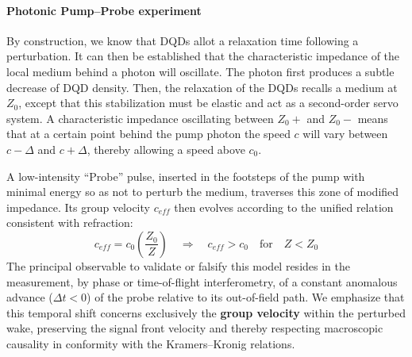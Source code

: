 \documentclass[11pt,a4paper]{article}
\theoremstyle{plain}
\theoremstyle{remark}
\begin{document}
\paragraph{Photonic Pump--Probe experiment}
By construction, we know that DQDs allot a relaxation time following a perturbation. It can then be established that the characteristic impedance of the local medium behind a photon will oscillate. The photon first produces a subtle decrease of DQD density. Then, the relaxation of the DQDs recalls a medium at $Z_0$, except that this stabilization must be elastic and act as a second-order servo system. A characteristic impedance oscillating between $Z_0+$ and $Z_0-$ means that at a certain point behind the pump photon the speed $c$ will vary between $c-\Delta$ and $c+\Delta$, thereby allowing a speed above $c_0$.

A low-intensity ``Probe'' pulse, inserted in the footsteps of the pump with minimal energy so as not to perturb the medium, traverses this zone of modified impedance. Its group velocity $c_{eff}$ then evolves according to the unified relation consistent with refraction:
\begin{equation}
c_{eff} = c_{0}\left(\frac{Z_{0}}{Z}\right) \quad \Rightarrow \quad c_{eff} > c_{0} \quad \text{for} \quad Z < Z_{0}
\end{equation}
The principal observable to validate or falsify this model resides in the measurement, by phase or time-of-flight interferometry, of a constant anomalous advance ($\Delta t < 0$) of the probe relative to its out-of-field path. We emphasize that this temporal shift concerns exclusively the \textbf{group velocity} within the perturbed wake, preserving the signal front velocity and thereby respecting macroscopic causality in conformity with the Kramers--Kronig relations.
\end{document}
